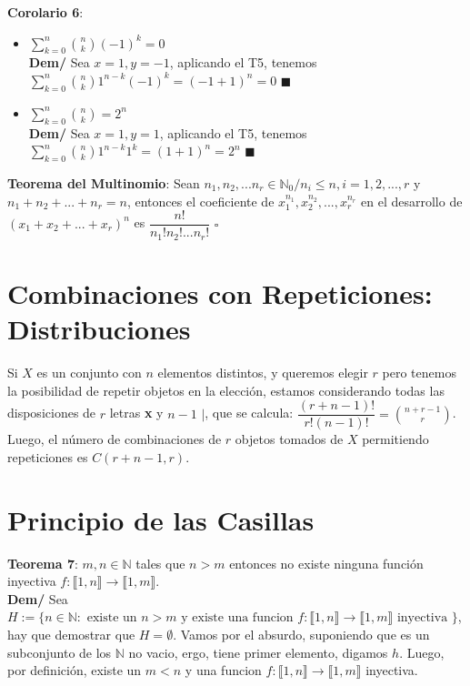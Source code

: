 \documentclass[11pt,a4paper]{article}
\newcommand*{\QEDA}{\null\nobreak\hfill\ensuremath{\blacksquare}}
\newcommand*{\QEDB}{\null\nobreak\hfill\ensuremath{\square}}
\begin{document}
\noindent \textbf{Corolario 6}: 
\begin{itemize}
\item $\sum_{k=0}^n {n \choose k} (-1)^k = 0$\\
\textbf{Dem/} Sea $x=1, y=-1$, aplicando el T5, tenemos $\sum_{k=0}^n {n \choose k} 1^{n-k}(-1)^k = (-1 + 1)^n = 0$ \QEDA
\item $\sum_{k=0}^n {n \choose k} = 2^n$\\
\textbf{Dem/} Sea $x=1, y=1$, aplicando el T5, tenemos $\sum_{k=0}^n {n \choose k} 1^{n-k}1^k = (1 + 1)^n = 2^n$ \QEDA
\end{itemize}

\noindent \textbf{Teorema del Multinomio}: Sean $n_1, n_2,...n_r \in \mathbb{N}_0 / n_i \leq n, i = 1,2,...,r$ y $n_1+n_2+...+n_r = n$, entonces el coeficiente de $x_1^{n_1},x_2^{n_2},...,x_r^{n_r}$ en el desarrollo de $(x_1+x_2+...+x_r)^n$ es $\dfrac{n!}{n_1!n_2!...n_r!}$ \QEDB

\newpage
\section{Combinaciones con Repeticiones: Distribuciones}
\noindent Si $X$ es un conjunto con $n$ elementos distintos, y queremos elegir $r$ pero tenemos la posibilidad de repetir objetos en la elección, estamos considerando todas las disposiciones de $r$ letras \textbf{x} y $n - 1$ $|$, que se calcula: $\dfrac{(r+n-1)!}{r!(n-1)!} = {n+r-1 \choose r}$. Luego, el número de combinaciones de $r$ objetos tomados de $X$ permitiendo repeticiones es $C(r + n - 1, r)$.

\section{Principio de las Casillas}
\noindent \textbf{Teorema 7}: $m,n \in \mathbb{N}$ tales que $n > m$ entonces no existe ninguna funci\'on inyectiva $f : \llbracket 1,n \rrbracket \rightarrow \llbracket 1,m \rrbracket$.\\
\textbf{Dem/} Sea $H := \{n \in \mathbb{N} : \text{ existe un $n > m$ y existe una funcion $f : \llbracket 1,n \rrbracket \rightarrow \llbracket 1,m \rrbracket$ inyectiva }\}$, hay que demostrar que $H = \emptyset$. Vamos por el absurdo, suponiendo que es un subconjunto de los $\mathbb{N}$ no vacio, ergo, tiene primer elemento, digamos $h$. Luego, por definici\'on, existe un $m < n$ y una funcion $f : \llbracket 1,n \rrbracket \rightarrow \llbracket 1,m \rrbracket$ inyectiva.
\end{document}

